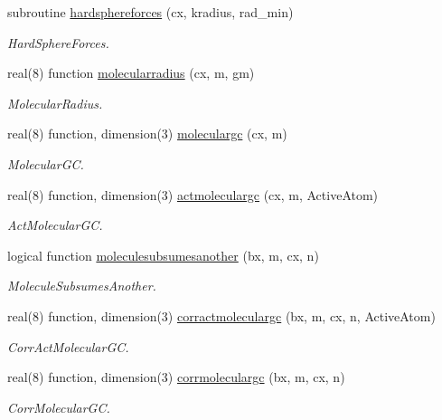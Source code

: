 \begin{DoxyCompactItemize}
subroutine \mbox{\hyperlink{namespacechemstr_a4bdb519846a266ecf21fb1abb2dd12fb}{hardsphereforces}} (cx, kradius, rad\+\_\+min)
\begin{DoxyCompactList}\small\item\em Hard\+Sphere\+Forces. \end{DoxyCompactList}\item 
real(8) function \mbox{\hyperlink{namespacechemstr_a09e4fc34319aa0a6d4f52fe3da954fca}{molecularradius}} (cx, m, gm)
\begin{DoxyCompactList}\small\item\em Molecular\+Radius. \end{DoxyCompactList}\item 
real(8) function, dimension(3) \mbox{\hyperlink{namespacechemstr_af0c4a9bb408a073e444be223a565e7cc}{moleculargc}} (cx, m)
\begin{DoxyCompactList}\small\item\em Molecular\+GC. \end{DoxyCompactList}\item 
real(8) function, dimension(3) \mbox{\hyperlink{namespacechemstr_a521f25a0628d92de9b89145bcd9fd1d5}{actmoleculargc}} (cx, m, Active\+Atom)
\begin{DoxyCompactList}\small\item\em Act\+Molecular\+GC. \end{DoxyCompactList}\item 
logical function \mbox{\hyperlink{namespacechemstr_abc7f8acc3a6b5cc02df929173e6f1731}{moleculesubsumesanother}} (bx, m, cx, n)
\begin{DoxyCompactList}\small\item\em Molecule\+Subsumes\+Another. \end{DoxyCompactList}\item 
real(8) function, dimension(3) \mbox{\hyperlink{namespacechemstr_afc5628a255fd4d03fa2e587ce60b371f}{corractmoleculargc}} (bx, m, cx, n, Active\+Atom)
\begin{DoxyCompactList}\small\item\em Corr\+Act\+Molecular\+GC. \end{DoxyCompactList}\item 
real(8) function, dimension(3) \mbox{\hyperlink{namespacechemstr_a25a9643b3e963cfdbd17379e8b2fdc40}{corrmoleculargc}} (bx, m, cx, n)
\begin{DoxyCompactList}\small\item\em Corr\+Molecular\+GC. \end{DoxyCompactList}\item 

\end{DoxyCompactItemize}
